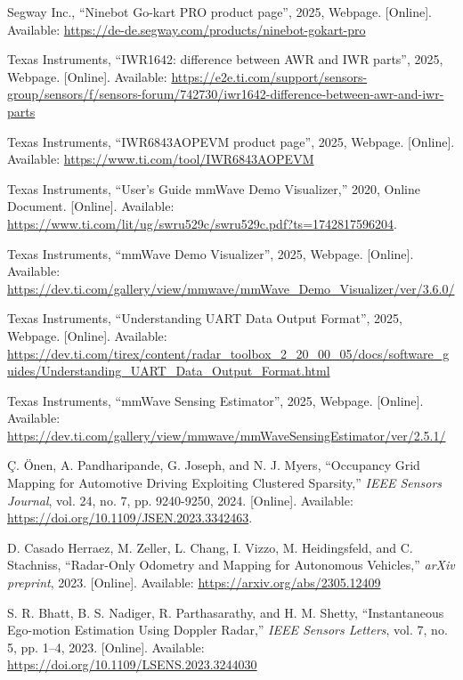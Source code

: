 
\begin{thebibliography}{00}

 Segway Inc., ``Ninebot Go-kart PRO product page'', 2025, Webpage. [Online]. Available: \url{https://de-de.segway.com/products/ninebot-gokart-pro}

 Texas Instruments, ``IWR1642: difference between AWR and IWR parts'', 2025, Webpage. [Online]. Available: \url{https://e2e.ti.com/support/sensors-group/sensors/f/sensors-forum/742730/iwr1642-difference-between-awr-and-iwr-parts}

 Texas Instruments, ``IWR6843AOPEVM product page'', 2025, Webpage. [Online]. Available: \url{https://www.ti.com/tool/IWR6843AOPEVM}

 Texas Instruments, ``User's Guide mmWave Demo Visualizer,'' 2020, Online Document. [Online]. Available: \url{https://www.ti.com/lit/ug/swru529c/swru529c.pdf?ts=1742817596204}.

Texas Instruments, 
``mmWave Demo Visualizer'', 2025, Webpage. [Online]. Available: \url{https://dev.ti.com/gallery/view/mmwave/mmWave_Demo_Visualizer/ver/3.6.0/}

 Texas Instruments, ``Understanding UART Data Output Format'', 2025, Webpage. [Online]. Available: \url{https://dev.ti.com/tirex/content/radar_toolbox_2_20_00_05/docs/software_guides/Understanding_UART_Data_Output_Format.html}

 Texas Instruments, ``mmWave Sensing Estimator'', 2025, Webpage. [Online]. Available: \url{https://dev.ti.com/gallery/view/mmwave/mmWaveSensingEstimator/ver/2.5.1/}

 Ç. Önen, A. Pandharipande, G. Joseph, and N. J. Myers, ``Occupancy Grid Mapping for Automotive Driving Exploiting Clustered Sparsity,'' \textit{IEEE Sensors Journal}, vol. 24, no. 7, pp. 9240-9250, 2024. [Online]. Available: \url{https://doi.org/10.1109/JSEN.2023.3342463}.

D. Casado Herraez, M. Zeller, L. Chang, I. Vizzo, M. Heidingsfeld, and C. Stachniss, 
``Radar-Only Odometry and Mapping for Autonomous Vehicles,'' 
\textit{arXiv preprint}, 2023. [Online]. Available: \url{https://arxiv.org/abs/2305.12409}

S. R. Bhatt, B. S. Nadiger, R. Parthasarathy, and H. M. Shetty, 
``Instantaneous Ego-motion Estimation Using Doppler Radar,'' 
\textit{IEEE Sensors Letters}, vol. 7, no. 5, pp. 1–4, 2023. [Online]. Available: \url{https://doi.org/10.1109/LSENS.2023.3244030}


\end{thebibliography}
